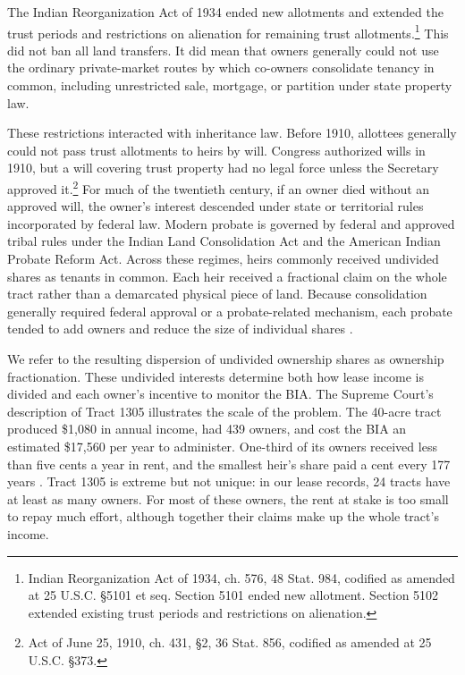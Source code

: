 \documentclass[12pt]{article}
\begin{document}
The Indian Reorganization Act of 1934 ended new allotments and extended the trust periods and restrictions on alienation for remaining trust allotments.\footnote{Indian Reorganization Act of 1934, ch. 576, 48 Stat. 984, codified as amended at 25 U.S.C. \S 5101 et seq. Section 5101 ended new allotment. Section 5102 extended existing trust periods and restrictions on alienation.} This did not ban all land transfers. It did mean that owners generally could not use the ordinary private-market routes by which co-owners consolidate tenancy in common, including unrestricted sale, mortgage, or partition under state property law.

These restrictions interacted with inheritance law. Before 1910, allottees generally could not pass trust allotments to heirs by will. Congress authorized wills in 1910, but a will covering trust property had no legal force unless the Secretary approved it.\footnote{Act of June 25, 1910, ch. 431, \S 2, 36 Stat. 856, codified as amended at 25 U.S.C. \S 373.} For much of the twentieth century, if an owner died without an approved will, the owner's interest descended under state or territorial rules incorporated by federal law. Modern probate is governed by federal and approved tribal rules under the Indian Land Consolidation Act and the American Indian Probate Reform Act. Across these regimes, heirs commonly received undivided shares as tenants in common. Each heir received a fractional claim on the whole tract rather than a demarcated physical piece of land. Because consolidation generally required federal approval or a probate-related mechanism, each probate tended to add owners and reduce the size of individual shares \citep{Shoemaker2003,Shoemaker2020,DippelFryeLeonard2025}.

We refer to the resulting dispersion of undivided ownership shares as ownership fractionation. These undivided interests determine both how lease income is divided and each owner's incentive to monitor the BIA. The Supreme Court's description of Tract 1305 illustrates the scale of the problem. The 40-acre tract produced \$1,080 in annual income, had 439 owners, and cost the BIA an estimated \$17,560 per year to administer. One-third of its owners received less than five cents a year in rent, and the smallest heir's share paid a cent every 177 years \citep{HodelIrving1987}. Tract 1305 is extreme but not unique: in our lease records, 24 tracts have at least as many owners. For most of these owners, the rent at stake is too small to repay much effort, although together their claims make up the whole tract's income.
\end{document}
